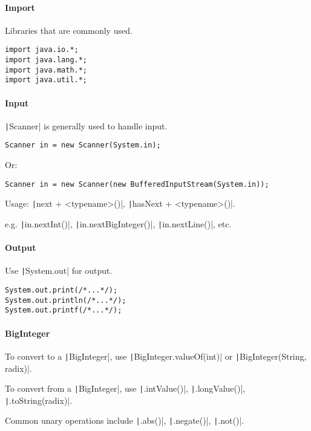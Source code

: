 \paragraph{Import}
Libraries that are commonly used.

\begin{verbatim}
import java.io.*;
import java.lang.*;
import java.math.*;
import java.util.*;
\end{verbatim}

\paragraph{Input}
\texttt|Scanner| is generally used to handle input.

\begin{verbatim}
Scanner in = new Scanner(System.in);
\end{verbatim}
Or:

\begin{verbatim}
Scanner in = new Scanner(new BufferedInputStream(System.in));
\end{verbatim}
Usage: \texttt|next + <typename>()|, \texttt|hasNext + <typename>()|.

e.g. \texttt|in.nextInt()|, \texttt|in.nextBigInteger()|, \texttt|in.nextLine()|, etc.

\paragraph{Output}
Use \texttt|System.out| for output.

\begin{verbatim}
System.out.print(/*...*/);
System.out.println(/*...*/);
System.out.printf(/*...*/);
\end{verbatim}

\paragraph{BigInteger}
To convert to a \texttt|BigInteger|, use \texttt|BigInteger.valueOf(int)| or \texttt|BigInteger(String, radix)|.

To convert from a \texttt|BigInteger|, use \texttt|.intValue()|, \texttt|.longValue()|, \texttt|.toString(radix)|.

Common unary operations include \texttt|.abs()|, \texttt|.negate()|, \texttt|.not()|.

